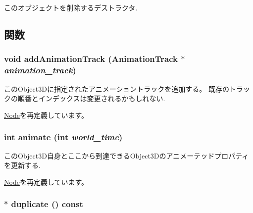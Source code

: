 このオブジェクトを削除するデストラクタ. 

\subsection{関数}
\hypertarget{classm3g_1_1Sprite3D_415c0b110f95410ded9b85e5d99a496b}{
\subsubsection[{addAnimationTrack}]{\setlength{\rightskip}{0pt plus 5cm}void addAnimationTrack ({\bf AnimationTrack} $\ast$ {\em animation\_\-track})}}
\label{classm3g_1_1Sprite3D_415c0b110f95410ded9b85e5d99a496b}


このObject3Dに指定されたアニメーショントラックを追加する。 既存のトラックの順番とインデックスは変更されるかもしれない. 

\hyperlink{classm3g_1_1Node_415c0b110f95410ded9b85e5d99a496b}{Node}を再定義しています。\hypertarget{classm3g_1_1Sprite3D_8aad1ceab4c2a03609c8a42324ce484d}{
\subsubsection[{animate}]{\setlength{\rightskip}{0pt plus 5cm}int animate (int {\em world\_\-time})}}
\label{classm3g_1_1Sprite3D_8aad1ceab4c2a03609c8a42324ce484d}


このObject3D自身とここから到達できるObject3Dのアニメーテッドプロパティを更新する. 

\hyperlink{classm3g_1_1Node_8aad1ceab4c2a03609c8a42324ce484d}{Node}を再定義しています。\hypertarget{classm3g_1_1Sprite3D_0af34e87be803eb476f9e118d2363246}{
\subsubsection[{duplicate}]{ $\ast$ duplicate () const}}
\label{classm3g_1_1Sprite3D_0af34e87be803eb476f9e118d2363246}


